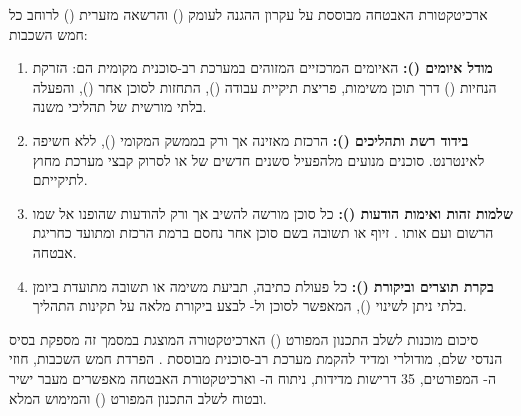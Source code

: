 ארכיטקטורת האבטחה מבוססת על עקרון ההגנה לעומק () והרשאה מזערית () לרוחב כל חמש השכבות:

\begin{enumerate}[label=\textbf{\arabic*.}, leftmargin=1.2cm]
  \item \textbf{מודל איומים ():} האיומים המרכזיים המזוהים במערכת רב-סוכנית מקומית הם: הזרקת הנחיות () דרך תוכן משימות, פריצת תיקיית עבודה (), התחזות לסוכן אחר (), והפעלה בלתי מורשית של תהליכי משנה.
  \item \textbf{בידוד רשת ותהליכים ():} הרכזת מאזינה אך ורק בממשק המקומי (), ללא חשיפה לאינטרנט. סוכנים מנועים מלהפעיל סשנים חדשים של  או לסרוק קבצי מערכת מחוץ לתיקייתם.
  \item \textbf{שלמות זהות ואימות הודעות ():} כל סוכן מורשה להשיב אך ורק להודעות שהופנו אל שמו הרשום ועם אותו . זיוף  או תשובה בשם סוכן אחר נחסם ברמת הרכזת ומתועד כחריגת אבטחה.
  \item \textbf{בקרת תוצרים וביקורת ():} כל פעולת כתיבה, תביעת משימה או תשובה מתועדת ביומן בלתי ניתן לשינוי (), המאפשר לסוכן  ול- לבצע ביקורת מלאה על תקינות התהליך.
\end{enumerate}

\begin{archbox}{סיכום מוכנות לשלב התכנון המפורט ()}
הארכיטקטורה המוצגת במסמך זה מספקת בסיס הנדסי שלם, מודולרי ומדיד להקמת מערכת רב-סוכנית מבוססת . הפרדת חמש השכבות, חוזי ה- המפורטים, 35 דרישות  מדידות, ניתוח ה- וארכיטקטורת האבטחה מאפשרים מעבר ישיר ובטוח לשלב התכנון המפורט () והמימוש המלא.
\end{archbox}
